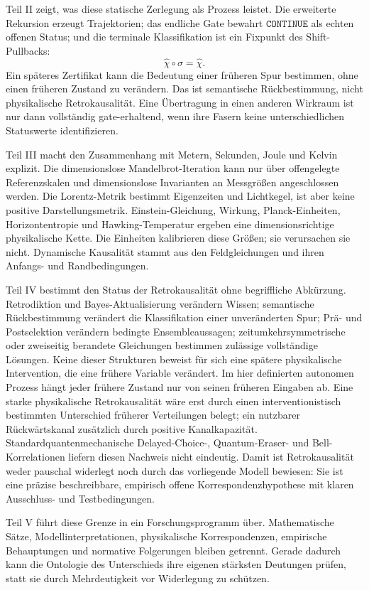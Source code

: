 \documentclass[11pt,a4paper]{article}
\theoremstyle{remark}
\newcommand{\CONTINUE}{\texttt{CONTINUE}}
\begin{document}
Teil II zeigt, was diese statische Zerlegung als Prozess leistet. Die
erweiterte Rekursion erzeugt Trajektorien; das endliche Gate bewahrt
\(\CONTINUE\) als echten offenen Status; und die terminale Klassifikation ist
ein Fixpunkt des Shift-Pullbacks:
\[
  \widehat\chi\circ\sigma=\widehat\chi.
\]
Ein späteres Zertifikat kann die Bedeutung einer früheren Spur bestimmen,
ohne einen früheren Zustand zu verändern. Das ist semantische
Rückbestimmung, nicht physikalische Retrokausalität. Eine Übertragung in einen
anderen Wirkraum ist nur dann vollständig gate-erhaltend, wenn ihre Fasern
keine unterschiedlichen Statuswerte identifizieren.

Teil III macht den Zusammenhang mit Metern, Sekunden, Joule und Kelvin
explizit. Die dimensionslose Mandelbrot-Iteration kann nur über offengelegte
Referenzskalen und dimensionslose Invarianten an Messgrößen angeschlossen
werden. Die Lorentz-Metrik bestimmt Eigenzeiten und Lichtkegel, ist aber keine
positive Darstellungsmetrik. Einstein-Gleichung, Wirkung, Planck-Einheiten,
Horizontentropie und Hawking-Temperatur ergeben eine dimensionsrichtige
physikalische Kette. Die Einheiten kalibrieren diese Größen; sie verursachen
sie nicht. Dynamische Kausalität stammt aus den Feldgleichungen und ihren
Anfangs- und Randbedingungen.

Teil IV bestimmt den Status der Retrokausalität ohne begriffliche
Abkürzung. Retrodiktion und Bayes-Aktualisierung verändern Wissen;
semantische Rückbestimmung verändert die Klassifikation einer unveränderten
Spur; Prä- und Postselektion verändern bedingte Ensembleaussagen;
zeitumkehrsymmetrische oder zweiseitig berandete Gleichungen bestimmen
zulässige vollständige Lösungen. Keine dieser Strukturen beweist für sich
eine spätere physikalische Intervention, die eine frühere Variable verändert.
Im hier definierten autonomen Prozess hängt jeder frühere Zustand nur von
seinen früheren Eingaben ab. Eine starke physikalische Retrokausalität wäre
erst durch einen interventionistisch bestimmten Unterschied früherer
Verteilungen belegt; ein nutzbarer Rückwärtskanal zusätzlich durch positive
Kanalkapazität. Standardquantenmechanische Delayed-Choice-, Quantum-Eraser-
und Bell-Korrelationen liefern diesen Nachweis nicht eindeutig. Damit ist
Retrokausalität weder pauschal widerlegt noch durch das vorliegende Modell
bewiesen: Sie ist eine präzise beschreibbare, empirisch offene
Korrespondenzhypothese mit klaren Ausschluss- und Testbedingungen.

Teil V führt diese Grenze in ein Forschungsprogramm über. Mathematische
Sätze, Modellinterpretationen, physikalische Korrespondenzen, empirische
Behauptungen und normative Folgerungen bleiben getrennt. Gerade dadurch kann
die Ontologie des Unterschieds ihre eigenen stärksten Deutungen prüfen,
statt sie durch Mehrdeutigkeit vor Widerlegung zu schützen.
\end{document}
